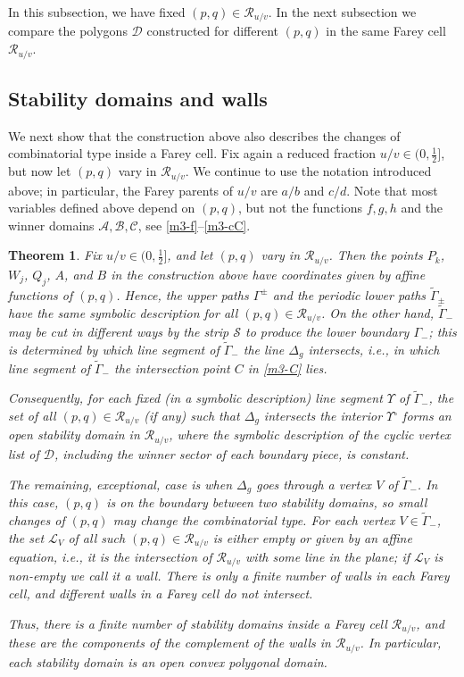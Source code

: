 \documentclass[11pt,reqno,tbtags,a4paper]{amsart}
\numberwithin{equation}{section}
\theoremstyle{plain}%
\newtheorem{theorem}{Theorem}[section]
\theoremstyle{definition}
\theoremstyle{remark}
\newcommand\inter{\ensuremath{^\circ}}
\newcommand\gD{\Delta}
\newcommand\gG{\Gamma}
\newcommand\gU{\Upsilon}
\newcommand\cA{\mathcal A}
\newcommand\cB{\mathcal B}
\newcommand\cC{\mathcal C}
\newcommand\cD{\mathcal D}
\newcommand\LL{{\mathcal L}}
\newcommand\cR{{\mathcal R}}
\newcommand\cS{{\mathcal S}}
\newcommand\tgG{\widetilde{\gG}}
\newcommand\0{{\boldsymbol 0}}
\newcommand\1{{\boldsymbol 1}}
\begin{document}
In this subsection, we have fixed $(p,q)\in\cR_{u/v}$.
In the next subsection we compare
the polygons $\cD$ constructed for different $(p,q)$
in the same Farey cell $\cR_{u/v}$.


\subsection{Stability domains and walls}\label{SSSD}

We next show that
the construction above also describes the changes of combinatorial type inside
a Farey cell.
Fix again a reduced fraction $u/v\in(0,\frac12]$,
but now let $(p,q)$ vary in $\cR_{u/v}$.
We continue to use the notation introduced above;
in particular,  the Farey parents of $u/v$ are $a/b$ and $c/d$.
Note that most variables defined above depend on $(p,q)$, but not the
functions $f,g,h$ and the winner domains $\cA,\cB,\cC$, 
see \eqref{m3-f}--\eqref{m3-cC}.

\begin{theorem}\label{TSD}
Fix $u/v\in(0,\frac12]$, and let $(p,q)$ vary in $\cR_{u/v}$.
Then the points $P_k$, $W_j$, $Q_j$, $A$, and $B$ in the construction above
have coordinates given by affine functions of $(p,q)$.
Hence, the upper paths $\gG^\pm$ and the periodic lower paths $\tgG_\pm$
have the same symbolic description for all $(p,q)\in\cR_{u/v}$.
On the other hand, $\tgG_-$ may be cut in different ways by the strip $\cS$
to produce the lower boundary $\gG_-$; this is determined by which line
segment of\/ $\tgG_-$ the line $\gD_g$ intersects, i.e.,
in which line segment of\/ $\tgG_-$ 
the intersection point $C$ in \eqref{m3-C} lies.

Consequently, for each fixed (in a symbolic description) 
line segment $\gU$ of $\tgG_-$, 
the set of all $(p,q)\in\cR_{u/v}$ (if any)
such that $\gD_g$ intersects the
interior $\gU\inter$ forms an open stability domain in $\cR_{u/v}$,
where
the symbolic description of 
the cyclic vertex list of $\cD$, including the winner sector of
each boundary piece, is constant.  

The remaining, exceptional, case is when 
$\gD_g$ goes through a vertex $V$ of\/ $\tgG_-$. In this case, $(p,q)$
is on the boundary between two stability domains, so small changes of
$(p,q)$ may change the combinatorial type.
For each vertex $V\in\tgG_-$, the set $\LL_V$
of all such $(p,q)\in\cR_{u/v}$
is either empty or given by an affine equation, i.e., it is the intersection
of $\cR_{u/v}$ with some line in the plane; 
if $\LL_V$ is non-empty we call it a \emph{wall}.
There is only a finite number of walls in each Farey cell, and
different walls in a Farey cell do not intersect.

Thus, there is a finite number of
stability domains inside a Farey cell $\cR_{u/v}$, and these are 
the components of the complement of the walls in $\cR_{u/v}$.
In particular, each stability domain is an open convex polygonal domain.
\end{theorem}
\end{document}
